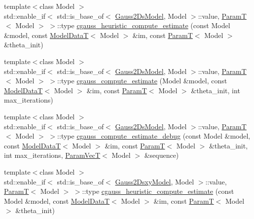 \begin{DoxyCompactItemize}
\item 
{\footnotesize template$<$class Model $>$ }\\std\+::enable\+\_\+if$<$ std\+::is\+\_\+base\+\_\+of$<$ \hyperlink{classmappel_1_1Gauss2DsModel}{Gauss2\+Ds\+Model}, Model $>$\+::value, \hyperlink{namespacemappel_a667925cb0d6c0e49f2f035cc5a9a6857}{ParamT}$<$ Model $>$ $>$\+::type \hyperlink{namespacemappel_aea7be2269d074757627dbe685484607c}{cgauss\+\_\+heuristic\+\_\+compute\+\_\+estimate} (const Model \&model, const \hyperlink{namespacemappel_a97f050df953605381ae9c901c3b125f1}{Model\+DataT}$<$ Model $>$ \&im, const \hyperlink{namespacemappel_a667925cb0d6c0e49f2f035cc5a9a6857}{ParamT}$<$ Model $>$ \&theta\+\_\+init)
\item 
{\footnotesize template$<$class Model $>$ }\\std\+::enable\+\_\+if$<$ std\+::is\+\_\+base\+\_\+of$<$ \hyperlink{classmappel_1_1Gauss2DsModel}{Gauss2\+Ds\+Model}, Model $>$\+::value, \hyperlink{namespacemappel_a667925cb0d6c0e49f2f035cc5a9a6857}{ParamT}$<$ Model $>$ $>$\+::type \hyperlink{namespacemappel_aa242fbe6915d17d31a3cce1c5a45634e}{cgauss\+\_\+compute\+\_\+estimate} (Model \&model, const \hyperlink{namespacemappel_a97f050df953605381ae9c901c3b125f1}{Model\+DataT}$<$ Model $>$ \&im, const \hyperlink{namespacemappel_a667925cb0d6c0e49f2f035cc5a9a6857}{ParamT}$<$ Model $>$ \&theta\+\_\+init, int max\+\_\+iterations)
\item 
{\footnotesize template$<$class Model $>$ }\\std\+::enable\+\_\+if$<$ std\+::is\+\_\+base\+\_\+of$<$ \hyperlink{classmappel_1_1Gauss2DsModel}{Gauss2\+Ds\+Model}, Model $>$\+::value, \hyperlink{namespacemappel_a667925cb0d6c0e49f2f035cc5a9a6857}{ParamT}$<$ Model $>$ $>$\+::type \hyperlink{namespacemappel_a600985daaf7683877334c37212a23640}{cgauss\+\_\+compute\+\_\+estimate\+\_\+debug} (const Model \&model, const \hyperlink{namespacemappel_a97f050df953605381ae9c901c3b125f1}{Model\+DataT}$<$ Model $>$ \&im, const \hyperlink{namespacemappel_a667925cb0d6c0e49f2f035cc5a9a6857}{ParamT}$<$ Model $>$ \&theta\+\_\+init, int max\+\_\+iterations, \hyperlink{namespacemappel_a0f86d3153e4e27b095012f140eea58de}{Param\+VecT}$<$ Model $>$ \&sequence)
\item 
{\footnotesize template$<$class Model $>$ }\\std\+::enable\+\_\+if$<$ std\+::is\+\_\+base\+\_\+of$<$ \hyperlink{classmappel_1_1Gauss2DsxyModel}{Gauss2\+Dsxy\+Model}, Model $>$\+::value, \hyperlink{namespacemappel_a667925cb0d6c0e49f2f035cc5a9a6857}{ParamT}$<$ Model $>$ $>$\+::type \hyperlink{namespacemappel_a9da41ac3fd825332b3f38efbb72f6610}{cgauss\+\_\+heuristic\+\_\+compute\+\_\+estimate} (const Model \&model, const \hyperlink{namespacemappel_a97f050df953605381ae9c901c3b125f1}{Model\+DataT}$<$ Model $>$ \&im, const \hyperlink{namespacemappel_a667925cb0d6c0e49f2f035cc5a9a6857}{ParamT}$<$ Model $>$ \&theta\+\_\+init)

\end{DoxyCompactItemize}
